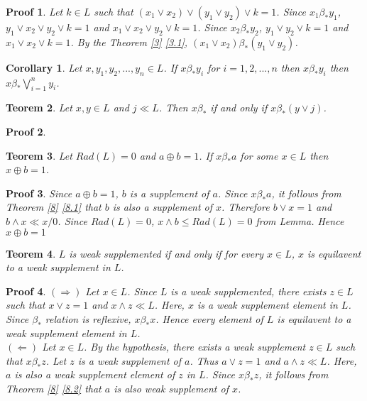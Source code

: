 \documentclass[a4paper,12pt]{article}
\numberwithin{equation}{section}
\theoremstyle{italik}
\newtheorem{teorem}{Teorem}[section]
\newtheorem{sonuc}[teorem]{Corollary}
\newtheorem*{ispat}{Proof}
\begin{document}
\begin{ispat}
    Let $ k \in L $ such that $ (x_1 \vee x_2 ) \vee (y_1 \vee y_2 ) \vee k = 1 $. Since $ x_1 \beta_* y_1 $, 
    $ y_1 \vee x_2 \vee y_2 \vee k = 1 $ and $ x_1 \vee x_2 \vee y_2 \vee k = 1 $. Since 
    $ x_2 \beta_* y_2 $, $ y_1 \vee y_2 \vee k = 1 $ and $ x_1 \vee x_2 \vee k = 1 $. 
    By the Theorem \ref{3} \ref{3.1}, $ ( x_1 \vee x_2 ) \beta_* ( y_1 \vee y_2 ) $.
\end{ispat}


\begin{sonuc}\label{19}
    Let $ x, y_1, y_2,...,y_n \in L $. If $ x \beta_* y_i $ for $ i=1,2,...,n $ then  
    $ x \beta_* y_i $ then $ \displaystyle x \beta_* \bigvee_{i=1}^n y_i $.
\end{sonuc}

\begin{teorem}\label{20}
    Let $ x,y \in L $ and $ j \ll L $. Then $ x \beta_* $ if and only if $ x \beta_* ( y \vee j ) $.
\end{teorem}

\begin{ispat}
\end{ispat}

\begin{teorem}\label{21}
    Let $ Rad(L)=0 $ and $ a \oplus b = 1 $. If $ x \beta_* a $ for some $ x \in L $ then $ x \oplus b = 1 $. 
\end{teorem}
\begin{ispat}
    Since $ a \oplus b = 1 $, $ b $ is a supplement of $ a $. Since $ x \beta_* a $, it follows from 
    Theorem \ref{8} \ref{8.1} that $ b $ is also a supplement of $ x $. Therefore $ b \vee x = 1 $ and 
    $ b \wedge x \ll x/0 $. Since $ Rad(L)=0 $, $ x \wedge b \leq Rad(L) = 0 $ from 
    Lemma. 
    Hence $ x \oplus b = 1 $
\end{ispat}

\begin{teorem}
    $ L $ is weak supplemented if and only if for every $ x \in L $, $ x $ is equilavent to a weak supplement in $ L $.
\end{teorem}

\begin{ispat}
    $ ( \Rightarrow ) $ 
    Let $ x \in L $. Since $ L $ is a weak supplemented, there exists $ z \in L $ such that 
    $ x \vee z = 1 $ and $ x \wedge z \ll L $. Here, $ x $ is a weak supplement element in $ L $. 
    Since $ \beta_* $ relation is reflexive, $ x \beta_* x $. Hence every element of $ L $ is 
    equilavent to a weak supplement element in $ L $. \\
    $ ( \Leftarrow ) $
    Let $ x \in L $. By the hypothesis, there exists a weak supplement $ z \in L $ such that 
    $ x \beta_* z $. Let $ z $ is a weak supplement of $ a $. Thus $ a \vee z = 1 $ and $ a \wedge z \ll L $. 
    Here, $ a $ is also a weak supplement element of $ z $ in $ L $. Since $ x \beta_* z $, 
    it follows from Theorem \ref{8} \ref{8.2} that $ a $ is also weak supplement of $ x $.  
\end{ispat}
  
\end{document}
